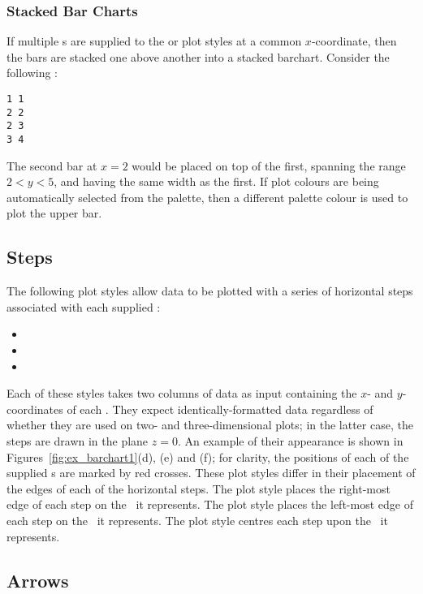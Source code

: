 \subsubsection{Stacked Bar Charts}

If multiple \datapoint s are supplied to the  or 
plot styles at a common $x$-coordinate, then the bars are stacked one above
another into a stacked barchart. Consider the following \datafile:

\begin{verbatim}
1 1
2 2
2 3
3 4
\end{verbatim}

\noindent The second bar at $x=2$ would be placed on top of the first, spanning
the range $2<y<5$, and having the same width as the first. If plot colours are
being automatically selected from the palette, then a different palette colour
is used to plot the upper bar.

\subsection{Steps}

The following plot styles allow data to be plotted with a series of horizontal
steps associated with each supplied \datapoint:
\begin{itemize}
\item {}
\item {}
\item {}
\end{itemize}
Each of these styles takes two columns of data as input containing the $x$- and
$y$-coordinates of each \datapoint.  They expect identically-formatted data
regardless of whether they are used on two- and three-dimensional plots; in the
latter case, the steps are drawn in the plane $z=0$.  An example of their
appearance  is shown in Figures~\ref{fig:ex_barchart1}(d), (e) and (f); for
clarity, the positions of each of the supplied \datapoint s are marked by red
crosses.  These plot styles differ in their placement of the edges of each of
the horizontal steps.  The  plot style places the right-most edge
of each step on the \datapoint\ it represents.  The  plot style
places the left-most edge of each step on the \datapoint\ it represents.  The
 plot style centres each step upon the \datapoint\ it
represents.

\subsection{Arrows}

